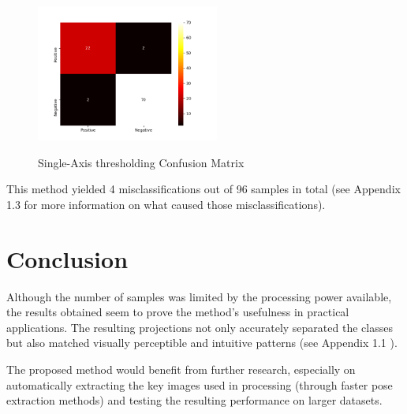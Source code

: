 \documentclass{bmvc2k}
\begin{document}
\begin{figure}[H]
   \begin{center}
      \label{m2}
      \includegraphics[width=6cm]{figures/ConfusionMatrixSingleAxis.png}
   \end{center}
   \caption{Single-Axis thresholding Confusion Matrix}
\end{figure}

This method yielded 4 misclassifications out of 96 samples in total (see Appendix 1.3 \cite{appendix} for more information on what caused those misclassifications).

\section{Conclusion}

Although the number of samples was limited by the processing power available, the results obtained seem to prove the method's usefulness in practical applications. The resulting projections not only accurately separated the classes but also matched visually perceptible and intuitive patterns (see Appendix 1.1 \cite{appendix}).

The proposed method would benefit from further research, especially on automatically extracting the key images used in processing (through faster pose extraction methods) and testing the resulting performance on larger datasets.


\end{document}
